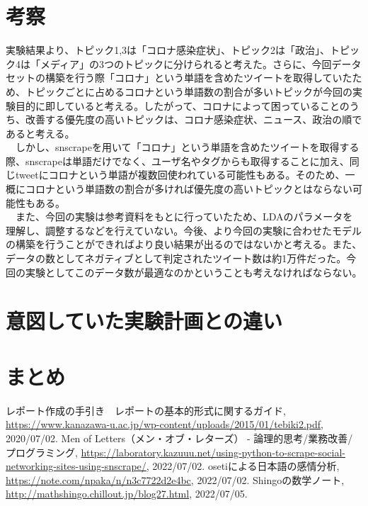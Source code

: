\documentclass[a4paper, 11pt, titlepage]{jsarticle}
\begin{document}
\section{考察}
実験結果より、トピック1,3は「コロナ感染症状」、トピック2は「政治」、トピック4は「メディア」の3つのトピックに分けられると考えた。さらに、今回データセットの構築を行う際「コロナ」という単語を含めたツイートを取得していたため、トピックごとに占めるコロナという単語数の割合が多いトピックが今回の実験目的に即していると考える。したがって、コロナによって困っていることのうち、改善する優先度の高いトピックは、コロナ感染症状、ニュース、政治の順であると考える。\\
　しかし、snscrapeを用いて「コロナ」という単語を含めたツイートを取得する際、snscrapeは単語だけでなく、ユーザ名やタグからも取得することに加え、同じtweetにコロナという単語が複数回使われている可能性もある。そのため、一概にコロナという単語数の割合が多ければ優先度の高いトピックとはならない可能性もある。\\
　また、今回の実験は参考資料をもとに行っていたため、LDAのパラメータを理解し、調整するなどを行えていない。今後、より今回の実験に合わせたモデルの構築を行うことができればより良い結果が出るのではないかと考える。また、データの数としてネガティブとして判定されたツイート数は約1万件だった。今回の実験としてこのデータ数が最適なのかということも考えなければならない。


\section{意図していた実験計画との違い}


\section{まとめ}


\begin{thebibliography}{n}
  レポート作成の手引き　レポートの基本的形式に関するガイド, \url{https://www.kanazawa-u.ac.jp/wp-content/uploads/2015/01/tebiki2.pdf}, 2020/07/02.
   Men of Letters（メン・オブ・レターズ） - 論理的思考/業務改善/プログラミング, \url{https://laboratory.kazuuu.net/using-python-to-scrape-social-networking-sites-using-snscrape/}, 2022/07/02.
    osetiによる日本語の感情分析, \url{https://note.com/npaka/n/n3c7722d2e4bc}, 2022/07/02.
Shingoの数学ノート, \url{http://mathshingo.chillout.jp/blog27.html}, 2022/07/05.
      

\end{thebibliography}
\end{document}

